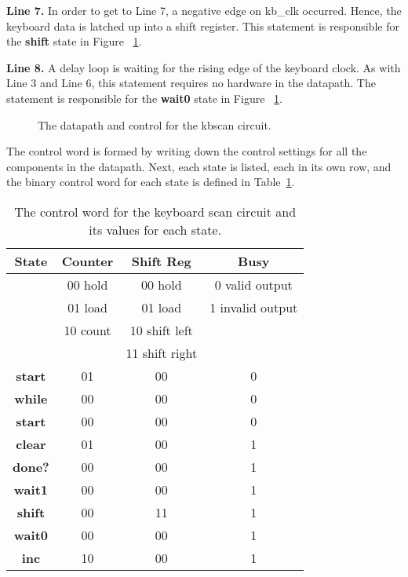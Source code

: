 \textbf{ Line 7.} In order to get to Line 7, a negative edge on kb\_clk occurred.
Hence, the keyboard data is latched up into a shift register.  This 
statement is responsible for the \textbf{ shift} state in Figure ~\ref{fig:datapathControlkbscan}.

\textbf{ Line 8.} A delay loop is waiting for the rising edge of the keyboard clock.  
As with Line 3 and Line 6, this statement requires no hardware in the datapath.  
The statement is responsible for the \textbf{ wait0} state in Figure ~\ref{fig:datapathControlkbscan}.

\begin{figure}[ht]
\caption{The datapath and control for the kbscan circuit.}
\label{fig:datapathControlkbscan}
\end{figure}

The control word is formed by writing down the control settings for 
all the components in the datapath.  Next, each state is listed, each 
in its own row, and the binary control word for each state is defined
in Table~\ref{table:kscan}.

\begin{table}
\begin{tabular}{c||c|c|c}  
\textbf{ State }  & Counter	& Shift Reg	&  Busy  		\\ \hline
        & 00 hold	& 00 hold	& 0 valid output	\\ \hline
        & 01 load	& 01 load	& 1 invalid output	\\ \hline
        & 10 count	& 10 shift left	& 			\\ \hline
        &      		& 11 shift right&			\\ \hline \hline
\textbf{ start }	&	01	&	00	&	0	\\ \hline
\textbf{ while }	&	00	&	00	&	0	\\ \hline
\textbf{ start }	&	00	&	00	&	0	\\ \hline
\textbf{ clear }	&	01	&	00	&	1	\\ \hline
\textbf{ done? }	&	00	&	00	&	1	\\ \hline
\textbf{ wait1 }	&	00	&	00	&	1	\\ \hline
\textbf{ shift }	&	00	&	11	&	1	\\ \hline
\textbf{ wait0 }	&	00	&	00	&	1	\\ \hline
\textbf{ inc }	&	10	&	00	&	1	\\ 
\end{tabular}
\caption{The control word for the keyboard scan circuit and its values for each state.}
\label{table:kscan}
\end{table}


